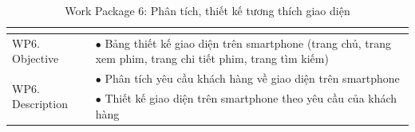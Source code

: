 \documentclass[a4paper]{book}
\begin{document}
\begin{table}[h!]
	\begin{center}
		\begin{tabular}{|p{4cm}|p{10cm}|}
			\hline
			\multicolumn{2}{|c|}{\cellcolor[HTML]{363636}{\color[HTML]{FFFFFF}Work package 6: Phân tích, thiết kế tương thích giao diện}}\\
			\hline
			\multirow{1}{*}{WP6. Objective} & $\bullet$ Bảng thiết kế giao diện trên smartphone (trang chủ, trang xem phim, trang chi tiết phim, trang tìm kiếm)\\
			\hline
			\multirow{2}{*}{WP6. Description} & $\bullet$ Phân tích yêu cầu khách hàng về giao diện trên smartphone \\
			& $\bullet$ Thiết kế giao diện trên smartphone theo yêu cầu của khách hàng\\
			\hline
		\end{tabular}
		\caption{Work Package 6: Phân tích, thiết kế tương thích giao diện}
		\label{table:frontend_thietke_tuongthich}
	\end{center}
\end{table}
\end{document}
